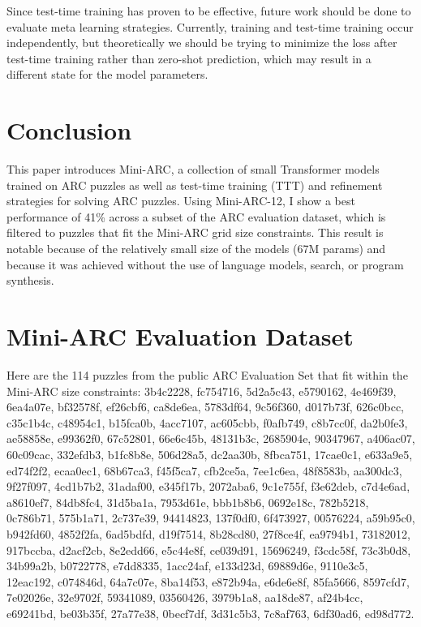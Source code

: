 \documentclass[10pt,twocolumn]{article}
\begin{document}
Since test-time training has proven to be effective, future work
should be done to evaluate meta learning strategies\cite{maml}.
Currently, training and test-time training occur independently, but
theoretically we should be trying to minimize the loss after
test-time training rather than zero-shot prediction, which may result in a
different state for the model parameters.

\section{Conclusion}
This paper introduces Mini-ARC, a collection of small Transformer models
trained on ARC puzzles as well as test-time training (TTT) and refinement
strategies for solving ARC puzzles. Using Mini-ARC-12, I show a best
performance of 41\%
across a subset of the ARC evaluation dataset, which is filtered to
puzzles that fit the Mini-ARC grid size constraints. This result is
notable because of the relatively small
size of the models (67M params) and because it was achieved without
the use of language models, search, or program synthesis.




\appendix

\section{Mini-ARC Evaluation Dataset}
\label{app:evaluation-dataset}

Here are the 114 puzzles from the public ARC Evaluation Set that fit
within the Mini-ARC size constraints: 3b4c2228, fc754716, 5d2a5c43,
e5790162, 4e469f39, 6ea4a07e, bf32578f, ef26cbf6, ca8de6ea, 5783df64,
9c56f360, d017b73f, 626c0bcc, c35c1b4c, c48954c1, b15fca0b, 4acc7107,
ac605cbb, f0afb749, c8b7cc0f, da2b0fe3, ae58858e, e99362f0, 67c52801,
66e6c45b, 48131b3c, 2685904e, 90347967, a406ac07, 60c09cac, 332efdb3,
b1fc8b8e, 506d28a5, dc2aa30b, 8fbca751, 17cae0c1, e633a9e5, ed74f2f2,
ecaa0ec1, 68b67ca3, f45f5ca7, cfb2ce5a, 7ee1c6ea, 48f8583b, aa300dc3,
9f27f097, 4cd1b7b2, 31adaf00, e345f17b, 2072aba6, 9c1e755f, f3e62deb,
c7d4e6ad, a8610ef7, 84db8fc4, 31d5ba1a, 7953d61e, bbb1b8b6, 0692e18c,
782b5218, 0c786b71, 575b1a71, 2c737e39, 94414823, 137f0df0, 6f473927,
00576224, a59b95c0, b942fd60, 4852f2fa, 6ad5bdfd, d19f7514, 8b28cd80,
27f8ce4f, ea9794b1, 73182012, 917bccba, d2acf2cb, 8e2edd66, e5c44e8f,
ce039d91, 15696249, f3cdc58f, 73c3b0d8, 34b99a2b, b0722778, e7dd8335,
1acc24af, e133d23d, 69889d6e, 9110e3c5, 12eac192, c074846d, 64a7c07e,
8ba14f53, e872b94a, e6de6e8f, 85fa5666, 8597cfd7, 7e02026e, 32e9702f,
59341089, 03560426, 3979b1a8, aa18de87, af24b4cc, e69241bd, be03b35f,
27a77e38, 0becf7df, 3d31c5b3, 7c8af763, 6df30ad6, ed98d772.
\end{document}

